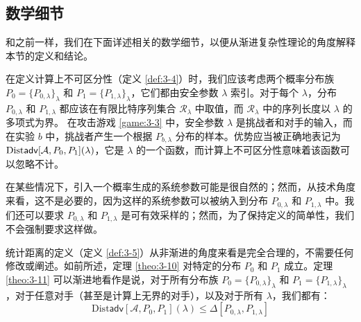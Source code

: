 \subsection{数学细节}\label{subsec:3-11-1}

和之前一样，我们在下面详述相关的数学细节，以便从渐进复杂性理论的角度解释本节的定义和结论。

在定义计算上不可区分性（定义 \ref{def:3-4}）时，我们应该考虑两个概率分布族 $P_0=\{P_{0,\lambda}\}_{\lambda}$ 和 $P_1=\{P_{1,\lambda}\}_{\lambda}$，它们都由安全参数 $\lambda$ 索引。对于每个 $\lambda$，分布 $P_{0,\lambda}$ 和 $P_{1,\lambda}$ 都应该在有限比特序列集合 $\mathcal{R}_\lambda$ 中取值，而 $\mathcal{R}_\lambda$ 中的序列长度以 $\lambda$ 的多项式为界。 在攻击游戏 \ref{game:3-3} 中，安全参数 $\lambda$ 是挑战者和对手的输入，而在实验 $b$ 中，挑战者产生一个根据 $P_{b,\lambda}$ 分布的样本。优势应当被正确地表记为 ${\rm Dist\mathsf{adv}}[\mathcal{A},P_0,P_1](\lambda)$，它是 $\lambda$ 的一个函数，而计算上不可区分性意味着该函数可以忽略不计。

在某些情况下，引入一个概率生成的系统参数可能是很自然的；然而，从技术角度来看，这不是必要的，因为这样的系统参数可以被纳入到分布 $P_{0,\lambda}$ 和 $P_{1,\lambda}$ 中。我们还可以要求 $P_{0,\lambda}$ 和 $P_{1,\lambda}$ 是可有效采样的；然而，为了保持定义的简单性，我们不会强制要求这样做。

统计距离的定义（定义 \ref{def:3-5}）从非渐进的角度来看是完全合理的，不需要任何修改或阐述。如前所述，定理 \ref{theo:3-10} 对特定的分布 $P_0$ 和 $P_1$ 成立。定理 \ref{theo:3-11} 可以渐进地看作是说，对于所有分布族 $P_0=\{P_{0,\lambda}\}_{\lambda}$ 和 $P_1=\{P_{1,\lambda}\}_{\lambda}$，对于任意对手（甚至是计算上无界的对手），以及对于所有 $\lambda$，我们都有：
\[
\mathrm{Dist}\mathsf{adv}[\mathcal{A},P_0,P_1](\lambda)
\leq\Delta[P_{0,\lambda},P_{1,\lambda}]
\]